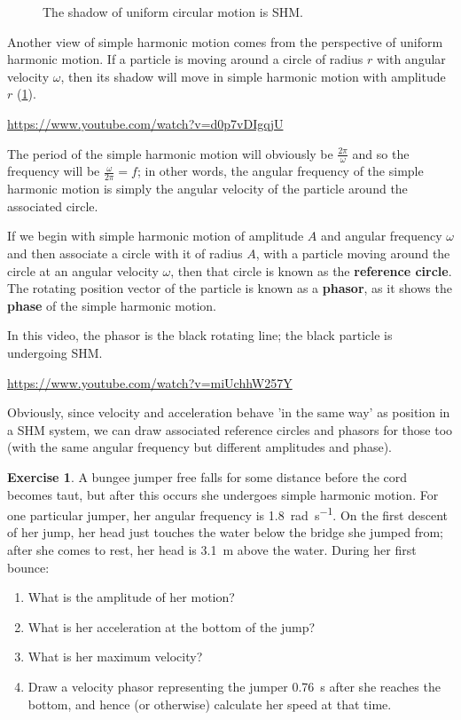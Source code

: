 \documentclass[a4paper]{amsbook}
\newcommand{\goandwatch}[1]{
\begin{center}
\begin{tcolorbox}[width=0.8\textwidth,colback={SkyBlue!20},title={\textbf{Go and watch...}},colbacktitle=MidnightBlue,coltitle=White]
  \textcolor{MidnightBlue}{\url{#1}}
\end{tcolorbox}
\end{center}}
\theoremstyle{definition}
\newtheorem{exercise}{Exercise}
\numberwithin{exercise}{chapter}
\numberwithin{exercise}{chapter}
\begin{document}
\begin{figure}
  \caption{The shadow of uniform circular motion is SHM.\label{fig:shadow}}
\end{figure}

Another view of simple harmonic motion comes from the perspective of uniform harmonic motion. If a particle is moving around a circle
of radius $ r $ with angular velocity $ \omega $, then its shadow will move in simple harmonic motion with amplitude $ r $ (\cref{fig:shadow}).

\goandwatch{https://www.youtube.com/watch?v=d0p7vDIgqjU}

The period of the simple harmonic motion will obviously be $ \frac{2\pi}{\omega} $ and so the frequency will be $ \frac{\omega}{2\pi} = f $;
in other words, the angular frequency of the simple harmonic motion is simply the angular velocity of the particle around the associated
circle.

If we begin with simple harmonic motion of amplitude $ A $ and angular frequency $ \omega $ and then associate a circle with it of radius $ A $,
with a particle moving around the circle at an angular velocity $ \omega $, then that circle is known as the \textbf{reference circle}. The rotating
position vector of the particle is known as a \textbf{phasor}, as it shows the \textbf{phase} of the simple harmonic motion.

In this video, the phasor is the black rotating line; the black particle is undergoing SHM.
\goandwatch{https://www.youtube.com/watch?v=miUchhW257Y}

Obviously, since velocity and acceleration behave 'in the same way' as position in a SHM system, we can draw associated reference circles
and phasors for those too (with the same angular frequency but different amplitudes and phase).

\begin{exercise}
  A bungee jumper free falls for some distance before the cord becomes taut, but after this occurs she undergoes simple harmonic
  motion. For one particular jumper, her angular frequency is \SI{1.8}{\radian\per\second}. On the first descent of her jump, her
  head just touches the water below the bridge she jumped from; after she comes to rest, her head is \SI{3.1}{\metre} above the water.
  During her first bounce:
  \begin{enumerate}
    \item What is the amplitude of her motion?
    \item What is her acceleration at the bottom of the jump?
    \item What is her maximum velocity?
    \item Draw a velocity phasor representing the jumper \SI{0.76}{\second} after she reaches the bottom, and
          hence (or otherwise) calculate her speed at that time.
  \end{enumerate}
\end{exercise}
\end{document}
